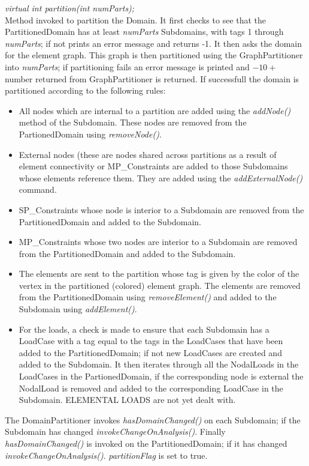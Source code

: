 {\em virtual int partition(int numParts);}\\
Method invoked to partition the Domain. It first checks to see that
the PartitionedDomain has at least {\em numParts} Subdomains, with tags
1 through {\em numParts}; if not prints an error message and returns -1. 
It then asks the domain for the element graph. This graph is then partitioned 
using the GraphPartitioner into {\em numParts}; if partitioning fails an error 
message is printed and  $-10 +$ number returned from GraphPartitioner is
returned. If successfull the domain is partitioned according to the
following rules: \begin{itemize}
\item All nodes which are internal to a partition are added using the
{\em addNode()} method of the Subdomain. These nodes are removed from
the PartionedDomain using {\em removeNode()}. 
\item External nodes (these are nodes shared across partitions as a
result of element connectivity or MP\_Constraints are added to those
Subdomains whose elements reference them. They are added using the
{\em addExternalNode()} command. 
\item SP\_Constraints whose node is interior to a Subdomain are removed
from the PartitionedDomain and added to the Subdomain. 
\item MP\_Constraints whose two nodes are interior to a Subdomain are
removed from the PartitionedDomain and added to the Subdomain.
\item The elements are sent to the partition whose tag is given by the
color of the vertex in the partitioned (colored) element graph. The
elements are removed from the PartitionedDomain using {\em
removeElement()} and added to the Subdomain using {\em addElement()}.
\item For the loads, a check is made to ensure that each Subdomain has
a LoadCase with a tag equal to the tags in the LoadCases that have
been added to the PartitionedDomain; if not new LoadCases are created
and added to the Subdomain. It then iterates through all the
NodalLoads in the LoadCases in the PartionedDomain, if the
corresponding node is external the NodalLoad is removed and added to
the corresponding LoadCase in the Subdomain. ELEMENTAL LOADS are not
yet dealt with. 
\end{itemize}

The DomainPartitioner invokes {\em hasDomainChanged()} on each Subdomain; if the Subdomain 
has changed {\em invokeChangeOnAnalysis()}. Finally {\em
hasDomainChanged()} is invoked on the PartitionedDomain; if it has
changed {\em invokeChangeOnAnalysis()}. {\em partitionFlag} is set to
true. \\ 


